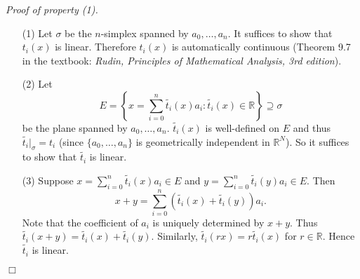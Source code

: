 \documentclass{article}
\begin{document}
\emph{Proof of property (1).}
\begin{enumerate}
\item[(1)]
  Let $\sigma$ be the $n$-simplex spanned by $a_0, \ldots, a_n$.
  It suffices to show that $t_i(x)$ is linear.
  Therefore $t_i(x)$ is automatically continuous
  (Theorem 9.7 in the textbook: \emph{Rudin, Principles of Mathematical Analysis, 3rd edition}).

\item[(2)]
  Let
  \[
    E
    =
    \left\{ x = \sum_{i=0}^{n} \widetilde{t_i}(x) a_i : \widetilde{t_i}(x) \in \mathbb{R} \right\}
    \supseteq \sigma
  \]
  be the plane spanned by $a_0, \ldots, a_n$.
  $\widetilde{t_i}(x)$ is well-defined on $E$ and thus $\widetilde{t_i}|_\sigma = t_i$
  (since $\{a_0, \ldots, a_n\}$ is geometrically independent in $\mathbb{R}^{N}$).
  So it suffices to show that $\widetilde{t_i}$ is linear.

\item[(3)]
  Suppose $x = \sum_{i=0}^{n} \widetilde{t_i}(x) a_i \in E$
  and $y = \sum_{i=0}^{n} \widetilde{t_i}(y) a_i \in E$.
  Then
  \[
    x + y = \sum_{i=0}^{n} (\widetilde{t_i}(x) + \widetilde{t_i}(y)) a_i.
  \]
  Note that the coefficient of $a_i$ is uniquely determined by $x + y$.
  Thus $\widetilde{t_i}(x+y) = \widetilde{t_i}(x) + \widetilde{t_i}(y)$.
  Similarly, $\widetilde{t_i}(rx) = r\widetilde{t_i}(x)$ for $r \in \mathbb{R}$.
  Hence $\widetilde{t_i}$ is linear.
\end{enumerate}
$\Box$ \\
\end{document}
